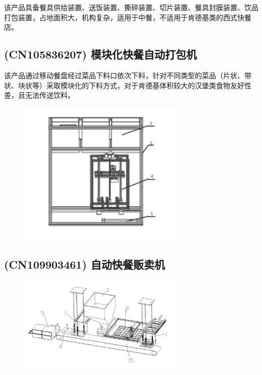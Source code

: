 该产品具备餐具供给装置、送饭装置、撕碎装置、切片装置、餐具封膜装置、饮品打包装置，占地面积大，机构复杂，适用于中餐，不适用于肯德基类的西式快餐店。


\subsection{(CN105836207) 模块化快餐自动打包机}




该产品通过移动餐盘经过菜品下料口依次下料，针对不同类型的菜品（片状、带状、块状等）采取模块化的下料方式，对于肯德基体积较大的汉堡类食物友好性差，且无法传送饮料。

\begin{figure}[h]
  \centering
  \includegraphics[width=8cm]{figure/intro3.jpg}
\end{figure}

\subsection{(CN109903461) 自动快餐贩卖机}

\begin{figure}[h]
  \centering
  \includegraphics[width=8cm]{figure/intro4.jpg}
\end{figure}

